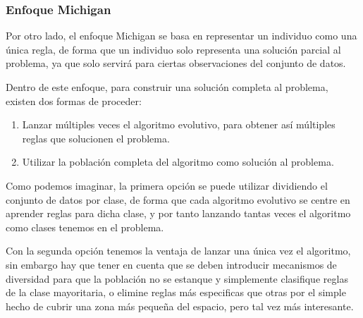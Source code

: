\subsubsection{Enfoque Michigan}

Por otro lado, el enfoque Michigan se basa en representar un individuo como una única regla, de forma que un individuo solo representa una solución parcial al problema, ya que solo servirá para ciertas observaciones del conjunto de datos.

Dentro de este enfoque, para construir una solución completa al problema, existen dos formas de proceder:

\begin{enumerate}
	\item Lanzar múltiples veces el algoritmo evolutivo, para obtener así múltiples reglas que solucionen el problema.
	\item Utilizar la población completa del algoritmo como solución al problema.
\end{enumerate}

Como podemos imaginar, la primera opción se puede utilizar dividiendo el conjunto de datos por clase, de forma que cada algoritmo evolutivo se centre en aprender reglas para dicha clase, y por tanto lanzando tantas veces el algoritmo como clases tenemos en el problema.

Con la segunda opción tenemos la ventaja de lanzar una única vez el algoritmo, sin embargo hay que tener en cuenta que se deben introducir mecanismos de diversidad para que la población no se estanque y simplemente clasifique reglas de la clase mayoritaria, o elimine reglas más especificas que otras por el simple hecho de cubrir una zona más pequeña del espacio, pero tal vez más interesante.













\newpage
